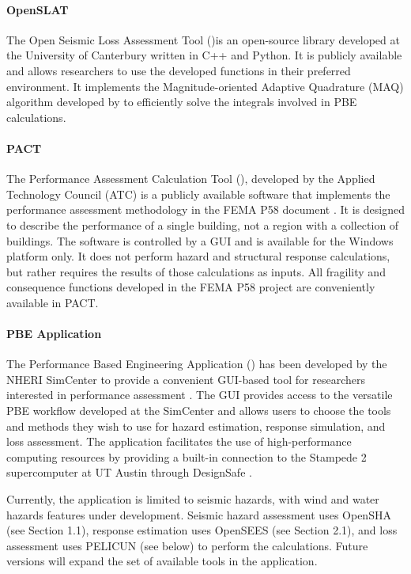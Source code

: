 \paragraph{OpenSLAT} The Open Seismic Loss Assessment Tool ()is an open-source library developed at the University of Canterbury written in C++ and Python. It is publicly available and allows researchers to use the developed functions in their preferred environment. It implements the Magnitude-oriented Adaptive Quadrature (MAQ) algorithm developed by \cite{bradley2010efficient} to efficiently solve the integrals involved in PBE calculations.


\paragraph{PACT} The Performance Assessment Calculation Tool (), developed by the Applied Technology Council (ATC) is a publicly available software that implements the performance assessment methodology in the FEMA P58 document \citep{atc2018p-58-2}. It is designed to describe the performance of a single building, not a region with a collection of buildings. The software is controlled by a GUI and is available for the Windows platform only. It does not perform hazard and structural response calculations, but rather requires the results of those calculations as inputs. All fragility and consequence functions developed in the FEMA P58 project are conveniently available in PACT.

\paragraph{PBE Application} The Performance Based Engineering Application () has been developed by the NHERI SimCenter to provide a convenient GUI-based tool for researchers interested in performance assessment \citep{mckenna2018performance}. The GUI provides access to the versatile PBE workflow developed at the SimCenter and allows users to choose the tools and methods they wish to use for hazard estimation, response simulation, and loss assessment. The application facilitates the use of high-performance computing resources by providing a built-in connection to the Stampede 2 supercomputer at UT Austin through DesignSafe \citep{rathje2017designsafe}.

Currently, the application is limited to seismic hazards, with wind and water hazards features under development. Seismic hazard assessment uses OpenSHA (see Section 1.1), response estimation uses OpenSEES (see Section 2.1), and loss assessment uses PELICUN (see below) to perform the calculations. Future versions will expand the set of available tools in the application.


